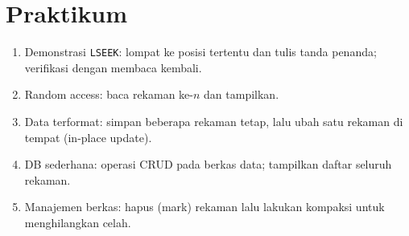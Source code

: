 \section{Praktikum}
\begin{enumerate}
  \item Demonstrasi \texttt{LSEEK}: lompat ke posisi tertentu dan tulis tanda penanda; verifikasi dengan membaca kembali.
  \item Random access: baca rekaman ke-\(n\) dan tampilkan.
  \item Data terformat: simpan beberapa rekaman tetap, lalu ubah satu rekaman di tempat (in-place update).
  \item DB sederhana: operasi CRUD pada berkas data; tampilkan daftar seluruh rekaman.
  \item Manajemen berkas: hapus (mark) rekaman lalu lakukan kompaksi untuk menghilangkan celah.
\end{enumerate}

